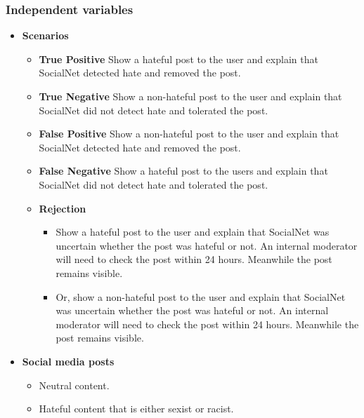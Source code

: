 \documentclass[a4paper]{article}
\begin{document}
\subsubsection{Independent variables}
\begin{itemize}
    \item \textbf{Scenarios}
          \begin{itemize}
              \item \textbf{True Positive} Show a hateful post to the user and explain that SocialNet detected hate and removed the post.
              \item \textbf{True Negative} Show a non-hateful post to the user and explain that SocialNet did not detect hate and tolerated the post.
              \item \textbf{False Positive} Show a non-hateful post to the user and explain that SocialNet detected hate and removed the post.
              \item \textbf{False Negative} Show a hateful post to the users and explain that SocialNet did not detect hate and tolerated the post.
              \item \textbf{Rejection}
                    \begin{itemize}
                        \item Show a hateful post to the user and explain that SocialNet was uncertain whether the post was hateful or not. An internal moderator will need to check the post within 24 hours. Meanwhile the post remains visible.
                        \item Or, show a non-hateful post to the user and explain that SocialNet was uncertain whether the post was hateful or not. An internal moderator will need to check the post within 24 hours. Meanwhile the post remains visible.
                    \end{itemize}
          \end{itemize}

    \item \textbf{Social media posts}
          \begin{itemize}
              \item Neutral content.
              \item Hateful content that is either sexist or racist.
          \end{itemize}
\end{itemize}
\end{document}
